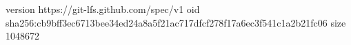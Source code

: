 version https://git-lfs.github.com/spec/v1
oid sha256:cb9bff3ec6713bee34ed24a8a5f21ac717dfcf278f17a6ec3f541c1a2b21fc06
size 1048672
